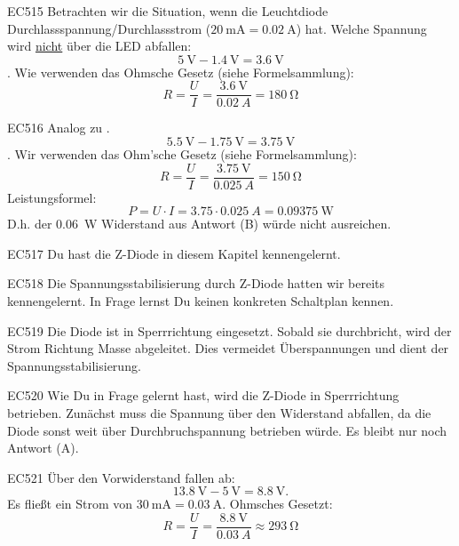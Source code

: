\begin{sol}{EC515}
  Betrachten wir die Situation, wenn die Leuchtdiode Durchlassspannung/Durchlassstrom ($\SI{20}{\milli\ampere}=\SI{0.02}{\ampere}$) hat. Welche Spannung wird \underline{nicht} über die LED abfallen:
  $$\SI{5}{\volt} - \SI{1.4}{\volt} = \SI{3.6}{\volt}$$.
  Wie verwenden das Ohmsche Gesetz (siehe Formelsammlung):
  $$R=\frac{U}{I} = \frac{\SI{3.6}{\volt}}{\SI{0.02}{A}} =  \SI{180}{\ohm}$$
\end{sol}
\begin{sol}{EC516}
  Analog zu .
   $$\SI{5.5}{\volt} - \SI{1.75}{\volt} = \SI{3.75}{\volt}$$.
Wir verwenden das Ohm’sche Gesetz (siehe Formelsammlung):
  $$R=\frac{U}{I} = \frac{\SI{3.75}{\volt}}{\SI{0.025}{A}} =  \SI{150}{\ohm}$$   
Leistungsformel:
  $$P=U\cdot I = \SI{3.75} \cdot {\SI{0.025}{A}} = \SI{0,09375}{\watt}$$ 
  D.h. der \SI{0,06}{\watt} Widerstand aus Antwort (B) würde nicht ausreichen.
\end{sol}

\begin{sol}{EC517}
  Du hast die Z-Diode in diesem Kapitel kennengelernt.
\end{sol}

\begin{sol}{EC518}
  Die Spannungsstabilisierung durch Z-Diode hatten wir bereits kennengelernt.
  In Frage  lernst Du keinen konkreten Schaltplan kennen.
\end{sol}

\begin{sol}{EC519}
  Die Diode ist in Sperrrichtung eingesetzt. Sobald sie durchbricht, wird der Strom Richtung Masse abgeleitet. Dies vermeidet Überspannungen und dient der Spannungsstabilisierung.
\end{sol}

\begin{sol}{EC520}
  Wie Du in Frage  gelernt hast, wird die Z-Diode in Sperrrichtung betrieben.
  Zunächst muss die Spannung über den Widerstand abfallen, da die Diode sonst weit über Durchbruchspannung betrieben würde. Es bleibt nur noch Antwort (A).
\end{sol}

\begin{sol}{EC521}
  Über den Vorwiderstand fallen ab:
     $$\SI{13.8}{\volt} - \SI{5}{\volt} = \SI{8.8}{\volt}.$$
  Es fließt ein Strom von $\SI{30}{\milli\ampere}=\SI{0.03}{\ampere}.$
  Ohmsches Gesetzt:
    $$R=\frac{U}{I} = \frac{\SI{8.8}{\volt}}{\SI{0.03}{A}} \approx  \SI{293}{\ohm}$$     
\end{sol}

